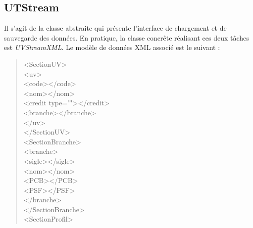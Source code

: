 \documentclass[a4paper,10pt,french]{report}
\begin{document}
				
	\subsection{UTStream}\label{subsec:UTStream}
	
		Il s'agit de la classe abstraite qui présente l'interface de chargement et de sauvegarde des données.
		En pratique, la classe concrête réalisant ces deux tâches est \emph{UVStreamXML}. Le modèle de données XML associé est le suivant :
		\begin{quote}

<SectionUV>\\
	\hspace*{1cm}<uv>\\
	\hspace*{1cm}	\hspace*{1cm}<code></code>\\
	\hspace*{1cm}	</nom>\\
	\hspace*{1cm}\hspace*{1cm}	<credit type=""></credit>\\
	\hspace*{1cm}\hspace*{1cm}	<branche></branche>\\
	\hspace*{1cm}</uv>\\
</SectionUV>\\
<SectionBranche>\\
	\hspace*{1cm}<branche>\\
	\hspace*{1cm}\hspace*{1cm}	<sigle></sigle>\\
	\hspace*{1cm}\hspace*{1cm}	<nom></nom>\\
	\hspace*{1cm}\hspace*{1cm}	<PCB></PCB>\\
	\hspace*{1cm}\hspace*{1cm}	<PSF></PSF>\\
	\hspace*{1cm}</branche>\\
</SectionBranche>\\
<SectionProfil>\\

\end{quote}
\end{document}
